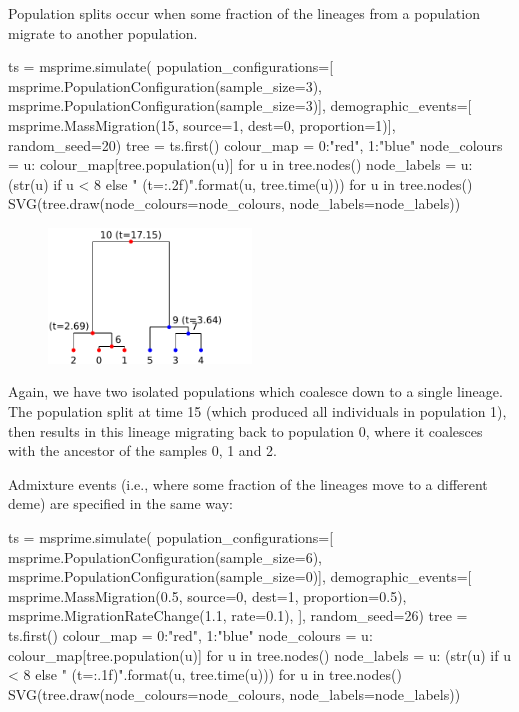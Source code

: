 \documentclass[graybox]{svmult}
\newcommand{\includenbimage}[1]{\begin{center}\texttt{[image: \#1]}\end{center}}
\begin{document}
Population splits occur when some fraction of the lineages from a
population migrate to another population.

\begin{pythoncode}
ts  = msprime.simulate(
    population_configurations=[
        msprime.PopulationConfiguration(sample_size=3),
        msprime.PopulationConfiguration(sample_size=3)],
    demographic_events=[
        msprime.MassMigration(15, source=1, dest=0, proportion=1)],
    random_seed=20)
tree = ts.first()
colour_map = {0:"red", 1:"blue"}
node_colours = {u: colour_map[tree.population(u)] for u in tree.nodes()}
node_labels = {
    u: (str(u) if u < 8 else "{} (t={:.2f})".format(u, tree.time(u)))
    for u in tree.nodes()}
SVG(tree.draw(node_colours=node_colours, node_labels=node_labels))
\end{pythoncode}


\begin{figure}
  \begin{center}
    \includegraphics[width=0.48\textwidth]{images/simulations_37_0.pdf}
  \end{center}
\end{figure}


Again, we have two isolated populations which coalesce down to a single
lineage. The population split at time 15 (which produced all individuals
in population 1), then results in this lineage migrating back to
population 0, where it coalesces with the ancestor of the samples 0, 1
and 2.

Admixture events (i.e., where some fraction of the lineages move to a
different deme) are specified in the same way:

\begin{pythoncode}
ts  = msprime.simulate(
    population_configurations=[
        msprime.PopulationConfiguration(sample_size=6),
        msprime.PopulationConfiguration(sample_size=0)],
    demographic_events=[
        msprime.MassMigration(0.5, source=0, dest=1, proportion=0.5),
        msprime.MigrationRateChange(1.1, rate=0.1),
    ],
    random_seed=26)
tree = ts.first()
colour_map = {0:"red", 1:"blue"}
node_colours = {u: colour_map[tree.population(u)] for u in tree.nodes()}
node_labels = {
    u: (str(u) if u < 8 else "{} (t={:.1f})".format(u, tree.time(u)))
    for u in tree.nodes()}
SVG(tree.draw(node_colours=node_colours, node_labels=node_labels))
\end{pythoncode}
\end{document}

